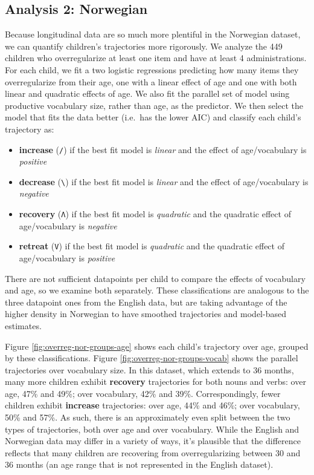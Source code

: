 \documentclass[
   11pt,
       ]{book}
\providecommand{\tightlist}{%
    \setlength{\itemsep}{0pt}\setlength{\parskip}{0pt}}
\begin{document}
\hypertarget{analysis-2-norwegian}{%
\subsection{Analysis 2: Norwegian}\label{analysis-2-norwegian}}

Because longitudinal data are so much more plentiful in the Norwegian dataset, we can quantify children's trajectories more rigorously. We analyze the 449 children who overregularize at least one item and have at least 4 administrations. For each child, we fit a two logistic regressions predicting how many items they overregularize from their age, one with a linear effect of age and one with both linear and quadratic effects of age. We also fit the parallel set of model using productive vocabulary size, rather than age, as the predictor. We then select the model that fits the data better (i.e.~has the lower AIC) and classify each child's trajectory as:

\begin{itemize}
\tightlist
\item
  \textbf{increase} (\texttt{/}) if the best fit model is \emph{linear} and the effect of age/vocabulary is \emph{positive}
\item
  \textbf{decrease} (\texttt{\textbackslash{}}) if the best fit model is \emph{linear} and the effect of age/vocabulary is \emph{negative}
\item
  \textbf{recovery} (\texttt{Λ}) if the best fit model is \emph{quadratic} and the quadratic effect of age/vocabulary is \emph{negative}
\item
  \textbf{retreat} (\texttt{V}) if the best fit model is \emph{quadratic} and the quadratic effect of age/vocabulary is \emph{positive}
\end{itemize}

There are not sufficient datapoints per child to compare the effects of vocabulary and age, so we examine both separately. These classifications are analogous to the three datapoint ones from the English data, but are taking advantage of the higher density in Norwegian to have smoothed trajectories and model-based estimates.

Figure \ref{fig:overreg-nor-groups-age} shows each child's trajectory over age, grouped by these classifications. Figure \ref{fig:overreg-nor-groups-vocab} shows the parallel trajectories over vocabulary size. In this dataset, which extends to 36 months, many more children exhibit \textbf{recovery} trajectories for both nouns and verbs: over age, 47\% and 49\%; over vocabulary, 42\% and 39\%. Correspondingly, fewer children exhibit \textbf{increase} trajectories: over age, 44\% and 46\%; over vocabulary, 50\% and 57\%. As such, there is an approximately even split between the two types of trajectories, both over age and over vocabulary. While the English and Norwegian data may differ in a variety of ways, it's plausible that the difference reflects that many children are recovering from overregularizing between 30 and 36 months (an age range that is not represented in the English dataset).
\end{document}

